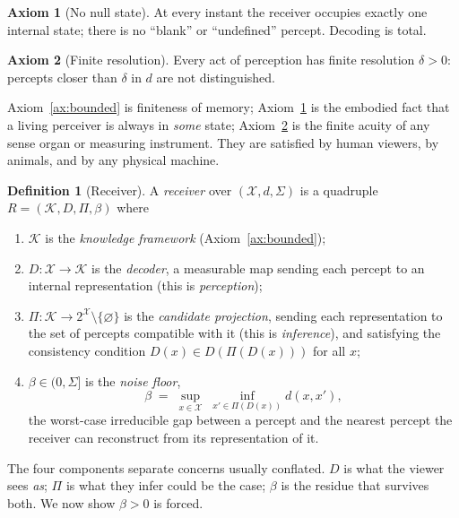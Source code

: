 \documentclass[twocolumn,11pt,a4paper]{article}
\theoremstyle{adv}
\theoremstyle{definition}
\newtheorem{definition}[theorem]{Definition}
\newtheorem{axiom}{Axiom}
\theoremstyle{remark}
\newcommand{\Out}{\mathcal{X}}         %
\newcommand{\Know}{\mathcal{K}}        %
\newcommand{\Dec}{D}                   %
\newcommand{\Proj}{\Pi}                %
\newcommand{\Recv}{R}                  %
\newcommand{\floor}{\beta}            %
\newcommand{\dist}{d}
\newcommand{\Sig}{\Sigma}
\begin{document}
\begin{axiom}[No null state]
\label{ax:null}
At every instant the receiver occupies exactly one internal state; there
is no ``blank'' or ``undefined'' percept. Decoding is total.
\end{axiom}

\begin{axiom}[Finite resolution]
\label{ax:resolution}
Every act of perception has finite resolution $\delta>0$: percepts closer
than $\delta$ in $\dist$ are not distinguished.
\end{axiom}

Axiom~\ref{ax:bounded} is finiteness of memory; Axiom~\ref{ax:null} is the
embodied fact that a living perceiver is always in \emph{some} state;
Axiom~\ref{ax:resolution} is the finite acuity of any sense organ or
measuring instrument. They are satisfied by human viewers, by animals, and
by any physical machine.

\begin{definition}[Receiver]
\label{def:receiver}
A \emph{receiver} over $(\Out,\dist,\Sig)$ is a quadruple
$\Recv=(\Know,\Dec,\Proj,\floor)$ where
\begin{enumerate}[label=(\roman*),leftmargin=1.8em,itemsep=1pt]
\item $\Know$ is the \emph{knowledge framework} (Axiom~\ref{ax:bounded});
\item $\Dec:\Out\to\Know$ is the \emph{decoder}, a measurable map sending
  each percept to an internal representation (this is \emph{perception});
\item $\Proj:\Know\to 2^{\Out}\setminus\{\varnothing\}$ is the
  \emph{candidate projection}, sending each representation to the set of
  percepts compatible with it (this is \emph{inference}), and satisfying
  the consistency condition $\Dec(x)\in\Dec(\Proj(\Dec(x)))$ for all $x$;
\item $\floor\in(0,\Sig]$ is the \emph{noise floor},
  \[
    \floor \;=\; \sup_{x\in\Out}\;\inf_{x'\in\Proj(\Dec(x))}\dist(x,x'),
  \]
  the worst-case irreducible gap between a percept and the nearest percept
  the receiver can reconstruct from its representation of it.
\end{enumerate}
\end{definition}

The four components separate concerns usually conflated. $\Dec$ is what
the viewer sees \emph{as}; $\Proj$ is what they infer could be the case;
$\floor$ is the residue that survives both. We now show $\floor>0$ is
forced.
\end{document}
